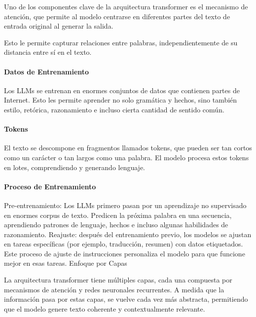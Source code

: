 \documentclass[a4paper12pt]{article}
\begin{document}
Uno de los componentes clave de la arquitectura transformer es el
mecanismo de atención, que permite al modelo centrarse en diferentes
partes del texto de entrada original al generar la salida.

Esto le permite capturar relaciones entre palabras, independientemente
de su distancia entre sí en el texto.

\hypertarget{datos-de-entrenamiento}{%
\paragraph{Datos de Entrenamiento}\label{datos-de-entrenamiento}}

Los LLMs se entrenan en enormes conjuntos de datos que contienen partes
de Internet. Esto les permite aprender no solo gramática y hechos, sino
también estilo, retórica, razonamiento e incluso cierta cantidad de
sentido común.

\hypertarget{tokens}{%
\paragraph{Tokens}\label{tokens}}

El texto se descompone en fragmentos llamados tokens, que pueden ser tan
cortos como un carácter o tan largos como una palabra. El modelo procesa
estos tokens en lotes, comprendiendo y generando lenguaje.

\hypertarget{proceso-de-entrenamiento}{%
\paragraph{Proceso de Entrenamiento}\label{proceso-de-entrenamiento}}

Pre-entrenamiento: Los LLMs primero pasan por un aprendizaje no
supervisado en enormes corpus de texto. Predicen la próxima palabra en
una secuencia, aprendiendo patrones de lenguaje, hechos e incluso
algunas habilidades de razonamiento. Reajuste: después del entrenamiento
previo, los modelos se ajustan en tareas específicas (por ejemplo,
traducción, resumen) con datos etiquetados. Este proceso de ajuste de
instrucciones personaliza el modelo para que funcione mejor en esas
tareas. Enfoque por Capas

La arquitectura transformer tiene múltiples capas, cada una compuesta
por mecanismos de atención y redes neuronales recurrentes. A medida que
la información pasa por estas capas, se vuelve cada vez más abstracta,
permitiendo que el modelo genere texto coherente y contextualmente
relevante.
\end{document}
